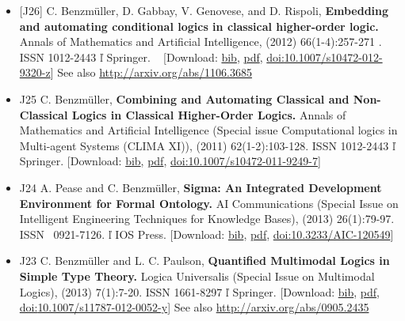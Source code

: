 \documentclass{article}
\newcommand{\tmstrong}[1]{\textbf{#1}}
\newenvironment{itemizedot}{\begin{itemize} \renewcommand{\labelitemi}{$\bullet$}\renewcommand{\labelitemii}{$\bullet$}\renewcommand{\labelitemiii}{$\bullet$}\renewcommand{\labelitemiv}{$\bullet$}}{\end{itemize}}
\begin{document}
{{\begin{itemizedot}
  \item {\tmstrong{}}[J26] C. Benzm\"uller, D. Gabbay, V. Genovese, and D.
  Rispoli, {\tmstrong{Embedding and automating conditional logics in classical
  higher-order logic.}} Annals of Mathema{\tmstrong{}}tics and Artificial
  Intelligence, (2012) 66(1-4{\tmstrong{}}):257-271{\tmstrong{}}
  .{\tmstrong{}} ISSN 1012-2443  \v{l}  Springer. \ {\color{grey} [Download:
  {\small \href{../papers/J26.bib}{bib}}, {\small
  \href{../papers/J26.pdf}{pdf}}, {\small
  {\tmstrong{}}\href{http://dx.doi.org/10.1007/s10472-012-9320-z}{doi:{\tmstrong{}}10.1007/s10472-012-9320-z}}]}
  See also
  \href{http://arxiv.org/abs/1106.3685}{http://arxiv.org/abs/1106.3685}
  {\tmstrong{}}
  
  \item [J25] C. Benzm\"uller, {\tmstrong{Combining and Automating Classical
  and Non-Classical Logics in Classical Higher-Order Logics.}} Annals of
  Mathema{\tmstrong{}}tics and Artificial Intelligence (Special issue
  Computational logics in Multi-agent Systems (CLIMA XI)){\tmstrong{}}, (2011)
  62(1-2):103-128{\tmstrong{}}. ISSN 1012-2443  \v{l}  Springer. {\color{grey}
  [Download: {\small \href{../papers/J25.bib}{bib}}, {\small
  \href{../papers/J25.pdf}{pdf}}, {\small
  {\tmstrong{}}\href{http://dx.doi.org/10.1007/s10472-011-9249-7}{doi:10.1007/s10472-011-9249-7}}]}
  \
  
  \item [J24] A. Pease and C. Benzm\"uller, {\tmstrong{Sigma: An Integrated
  Development Environment for Formal Ontology.}} AI Communications (Special
  Issue on Intelligent Engineering Techniques for Knowledge Bases), (2013)
  26(1):79-97. ISSN \ 0921-7126.  \v{l}  IOS Press. {\tmstrong{}}{\color{grey}
  [Download: {\small \href{../papers/J24.bib}{bib}}, {\small
  \href{../papers/J24.pdf}{pdf}}, {\small
  \href{http://dx.doi.org/10.3233/AIC-120549}{doi:10.3233/AIC-120549}}]}
  
  \item [J23] C. Benzm\"uller and L. C. Paulson, {\tmstrong{Quantified
  Multimodal Logics in Simple Type Theory.}} Logica Universalis (Special Issue
  on Multimodal Logics){\tmstrong{}}, (2013) 7(1):7-20{\tmstrong{}}. ISSN
  1661-8297  \v{l}  Springer. {\color{grey} [Download: {\small
  \href{../papers/J23.bib}{bib}}, {\small
  \href{http://arxiv.org/abs/0905.2435}{pdf}}, {\small
  {\tmstrong{}}\href{http://dx.doi.org/10.1007/s11787-012-0052-y}{doi:{\tmstrong{}}10.1007/s11787-012-0052-y{\tmstrong{}}}}]}
  See also
  \href{http://arxiv.org/abs/0905.2435}{http://arxiv.org/abs/0905.2435}
  

\end{itemizedot}}}
\end{document}
